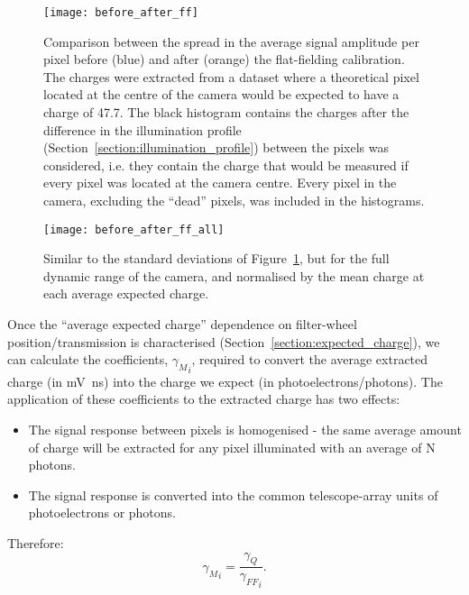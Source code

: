 \begin{figure}
	\centering
    \texttt{[image: before\_after\_ff]} 
	\caption[Flat-field Residuals]{Comparison between the spread in the average signal amplitude per pixel before (blue) and after (orange) the flat-fielding calibration. The charges were extracted from a dataset where a theoretical pixel located at the centre of the camera would be expected to have a charge of \SI{47.7}{\pe}. The black histogram contains the charges after the difference in the illumination profile (Section~\ref{section:illumination_profile}) between the pixels was considered, i.e. they contain the charge that would be measured if every pixel was located at the camera centre. Every pixel in the camera, excluding the ``dead'' pixels, was included in the histograms.}
	\label{fig:before_after_ff}
\end{figure}

\begin{figure}
	\centering
    \texttt{[image: before\_after\_ff\_all]} 
	\caption[Flat-field residuals versus average expected charge.]{Similar to the standard deviations of Figure~\ref{fig:before_after_ff}, but for the full dynamic range of the camera, and normalised by the mean charge at each average expected charge.}
	\label{fig:before_after_ff_all}
\end{figure}

Once the ``average expected charge'' dependence on filter-wheel position/transmission is characterised (Section~\ref{section:expected_charge}), we can calculate the coefficients, ${\gamma_M}_i$, required to convert the average extracted charge (in \si{mV ns}) into the charge we expect (in photoelectrons/photons). The application of these coefficients to the extracted charge has two effects:
\begin{itemize}
\item The signal response between pixels is homogenised - the same average amount of charge will be extracted for any pixel illuminated with an average of N photons.
\item The signal response is converted into the common telescope-array units of photoelectrons or photons.
\end{itemize}
Therefore:
\begin{equation} \label{eq:ff}
{\gamma_M}_i = \frac{\gamma_Q}{{\gamma_{FF}}_i}.
\end{equation}

